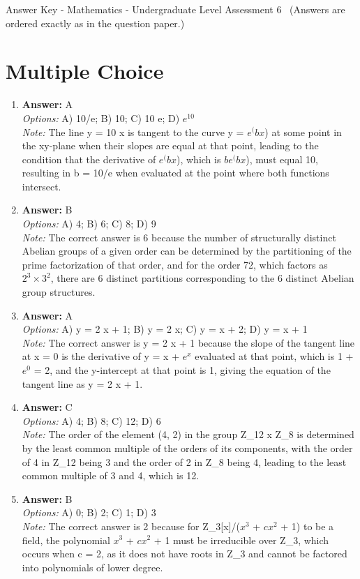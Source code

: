 \documentclass[12pt]{article}
\begin{document}
\begin{center}
Answer Key - Mathematics - Undergraduate Level Assessment 6 \
\small (Answers are ordered exactly as in the question paper.)
\end{center}

\section*{Multiple Choice}
\begin{enumerate}[label=\arabic*.]
\item \textbf{Answer:} A
\\ \textit{Options:} A) 10/e; B) 10; C) 10 e; D) $e^10$
\\ \textit{Note:} The line y = 10 x is tangent to the curve y = $e^(bx$) at some point in the xy-plane when their slopes are equal at that point, leading to the condition that the derivative of $e^(bx$), which is $be^(bx$), must equal 10, resulting in b = 10/e when evaluated at the point where both functions intersect.
\item \textbf{Answer:} B
\\ \textit{Options:} A) 4; B) 6; C) 8; D) 9
\\ \textit{Note:} The correct answer is 6 because the number of structurally distinct Abelian groups of a given order can be determined by the partitioning of the prime factorization of that order, and for the order 72, which factors as \(2^3 \times 3^2\), there are 6 distinct partitions corresponding to the 6 distinct Abelian group structures.
\item \textbf{Answer:} A
\\ \textit{Options:} A) y = 2 x + 1; B) y = 2 x; C) y = x + 2; D) y = x + 1
\\ \textit{Note:} The correct answer is y = 2 x + 1 because the slope of the tangent line at x = 0 is the derivative of y = x + $e^x$ evaluated at that point, which is 1 + $e^0$ = 2, and the y-intercept at that point is 1, giving the equation of the tangent line as y = 2 x + 1.
\item \textbf{Answer:} C
\\ \textit{Options:} A) 4; B) 8; C) 12; D) 6
\\ \textit{Note:} The order of the element (4, 2) in the group Z\_12 x Z\_8 is determined by the least common multiple of the orders of its components, with the order of 4 in Z\_12 being 3 and the order of 2 in Z\_8 being 4, leading to the least common multiple of 3 and 4, which is 12.
\item \textbf{Answer:} B
\\ \textit{Options:} A) 0; B) 2; C) 1; D) 3
\\ \textit{Note:} The correct answer is 2 because for Z\_3[x]/($x^3$ + $cx^2$ + 1) to be a field, the polynomial $x^3$ + $cx^2$ + 1 must be irreducible over Z\_3, which occurs when c = 2, as it does not have roots in Z\_3 and cannot be factored into polynomials of lower degree.
\end{enumerate}
\end{document}
